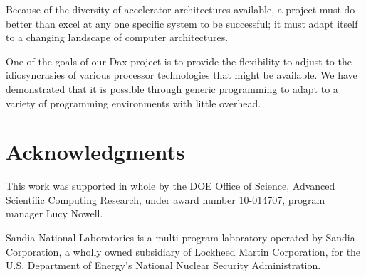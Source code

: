 \documentclass[conference]{IEEEtran}
\begin{document}
Because of the diversity of accelerator architectures available, a project
must do better than excel at any one specific system to be successful; it
must adapt itself to a changing landscape of computer architectures.

One of the goals of our Dax project is to provide the flexibility to adjust
to the idiosyncrasies of various processor technologies that might be
available.  We have demonstrated that it is possible through generic
programming to adapt to a variety of programming environments with little
overhead.

\section*{Acknowledgments}

\noindent
This work was supported in whole by the DOE Office of Science, Advanced
Scientific Computing Research, under award number 10-014707, program
manager Lucy Nowell.

Sandia National Laboratories is a multi-program laboratory operated by
Sandia Corporation, a wholly owned subsidiary of Lockheed Martin
Corporation, for the U.S. Department of Energy's National Nuclear Security
Administration.



\end{document}
